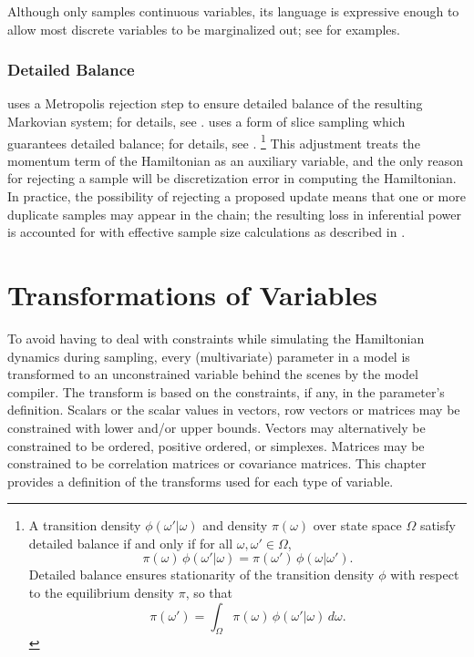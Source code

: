 Although \Stan only samples continuous variables, its language is
expressive enough to allow most discrete variables to be marginalized
out; see  for examples.

\subsection{Detailed Balance}

\HMC uses a Metropolis rejection step to ensure detailed balance of
the resulting Markovian system; for details, see \citep{Neal:2011}.
\NUTS uses a form of slice sampling which guarantees detailed balance;
for details, see \citep{Hoffman-Gelman:2011,Hoffman-Gelman:2013}.%
%
\footnote{A transition density $\phi(\omega'|\omega)$ and density
  $\pi(\omega)$ over state space $\Omega$ satisfy detailed balance if
  and only if for all $\omega, \omega' \in \Omega$,
\[
\pi(\omega) \, \phi(\omega'|\omega)
=
\pi(\omega') \, \phi(\omega | \omega').
\]
Detailed balance ensures stationarity of the transition density $\phi$
with respect to the equilibrium density $\pi$, so that
\[
\pi(\omega') = \int_{\Omega} \pi(\omega) \, \phi(\omega'|\omega) \, d\omega.
\]
} 
%
This adjustment treats the momentum term of the Hamiltonian as an
auxiliary variable, and the only reason for rejecting a sample will be
discretization error in computing the Hamiltonian.  In practice, the
possibility of rejecting a proposed update means that one or more
duplicate samples may appear in the chain; the resulting loss in
inferential power is accounted for with effective sample size
calculations as described in .


\chapter{Transformations of Variables}\label{variable-transforms.chapter}

\noindent
To avoid having to deal with constraints while simulating the
Hamiltonian dynamics during sampling, every (multivariate) parameter
in a \Stan model is transformed to an unconstrained variable behind
the scenes by the model compiler.  The transform is based on the
constraints, if any, in the parameter's definition.  Scalars or the
scalar values in vectors, row vectors or matrices may be constrained
with lower and/or upper bounds.  Vectors may alternatively be
constrained to be ordered, positive ordered, or simplexes.  Matrices
may be constrained to be correlation matrices or covariance matrices.
This chapter provides a definition of the transforms used for each
type of variable.

